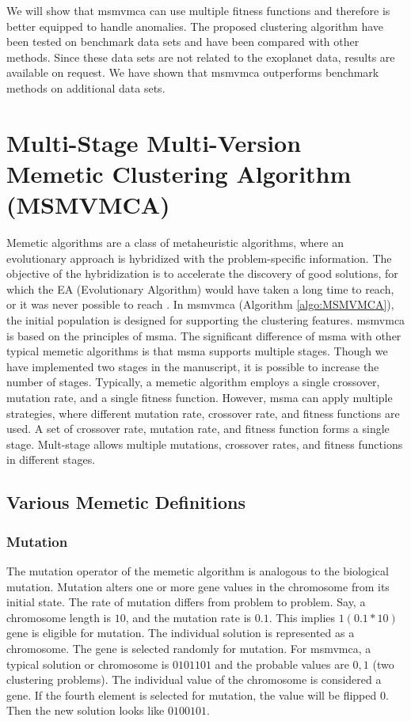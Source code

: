\documentclass[fleqn,usenatbib]{mnras}
\begin{document}
We will show that \glsdisablehyper \acrshort{msmvmca} can use multiple fitness functions and therefore is better equipped to handle anomalies. The proposed clustering algorithm have been tested on benchmark data sets and have been compared with other methods. Since these data sets are not related to the exoplanet data, results are available on request. We have shown that \acrshort{msmvmca} outperforms benchmark methods on additional data sets.
 
\section{Multi-Stage Multi-Version Memetic Clustering Algorithm (MSMVMCA)}
\label{MSMVMCAsection}

Memetic algorithms are a class of metaheuristic algorithms, where an evolutionary approach is hybridized with the problem-specific information. The objective of the hybridization is to accelerate the discovery of good solutions, for which the EA (Evolutionary Algorithm) would have taken a long time to reach, or it was never possible to reach \citep{Aragn}. In \acrshort{msmvmca} (Algorithm \ref{algo:MSMVMCA}), the initial population is designed for supporting the clustering features. \acrshort{msmvmca} is based on the principles of \acrfull{msma}. The significant difference of \acrshort{msma} with other typical memetic algorithms is that \acrshort{msma} supports multiple stages. Though we have implemented two stages in the manuscript, it is possible to increase the number of stages. Typically, a memetic algorithm employs a single crossover, mutation rate, and a single fitness function. However, \acrshort{msma} can apply multiple strategies, where different mutation rate, crossover rate, and fitness functions are used. A set of crossover rate, mutation rate, and fitness function forms a single stage. Mult-stage allows multiple mutations, crossover rates, and fitness functions in different stages.  

\subsection{Various Memetic Definitions}

\subsubsection{Mutation}

The mutation operator of the memetic algorithm is analogous to the biological mutation. Mutation alters one or more gene values in the chromosome from its initial state. The rate of mutation differs from problem to problem. Say, a chromosome length is $10$, and the mutation rate is  $0.1$. This implies $1 (0.1*10)$ gene is eligible for mutation. The individual solution is represented as a chromosome. The gene is selected randomly for mutation. For \acrshort{msmvmca}, a typical solution or chromosome is $0 1 0 1 1 0 1$ and the probable values are $0,1$ (two clustering problems). The individual value of the chromosome is considered a gene. If the fourth element is selected for mutation, the value will be flipped $0$. Then the new solution looks like $0 1 0 0 1 0 1$.
\end{document}

